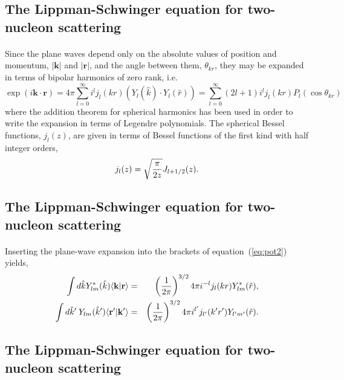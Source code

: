 \documentclass[%
twoside,                 %
final,                   %
10pt]{article}
\begin{document}
\subsection*{The Lippman-Schwinger equation for two-nucleon scattering}

\paragraph{}
Since the plane waves depend only on the absolute values of position and momentum, $\vert\mathbf{k}\vert$ and 
$\vert\mathbf{r}\vert$,
and the angle between them, $\theta_{kr}$, they may be expanded in terms of bipolar harmonics of 
zero rank, i.e.  
\[ 
  \exp{(i \mathbf{k}\cdot \mathbf{r})} = 4\pi\sum_{l=0}^{\infty} i^l j_l(kr)\left( Y_l(\hat{k}) \cdot Y_l(\hat{r}) \right)= \sum_{l=0}^{\infty} (2l+1)i^l j_l(kr) P_l(\cos \theta_{kr}) 
\]
where the addition theorem for spherical harmonics has been used in order to write
the expansion in terms of Legendre polynomials. The spherical Bessel functions, $j_l(z)$,  
are given in terms of Bessel functions of the first kind with half integer orders,  
\[
j_l(z) = \sqrt{\pi \over 2 z} J_{l+1/2}(z).  
\]



\subsection*{The Lippman-Schwinger equation for two-nucleon scattering}

\paragraph{}
Inserting the plane-wave expansion
into the brackets of equation~(\ref{eq:pot2}) yields, 
\begin{eqnarray*}
  \nonumber
  \int d{\hat{k}}  Y_{lm}^*(\hat{k})\langle \mathbf{k}\vert \mathbf{r} \rangle & = &  
  \left( {1\over 2\pi} \right) ^{3/2}4\pi i^{-l} j_l(kr) Y_{lm}^*(\hat{r}), \\  
  \nonumber
  \int d{\hat{k}'}\:   Y_{lm}(\hat{k}') \langle \mathbf{r'}\vert \mathbf{k}' \rangle & = &  
  \left( {1\over 2\pi} \right) ^{3/2}4\pi i^{l'} j_{l'}(k'r') Y_{l'm'}(\hat{r}). 
\end{eqnarray*}



\subsection*{The Lippman-Schwinger equation for two-nucleon scattering}
\end{document}
